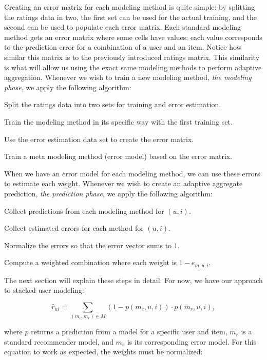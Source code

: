 Creating an error matrix for each modeling method is quite simple:
by splitting the ratings data in two,
the first set can be used for the actual training, and the second
can be used to populate each error matrix.
Each standard modeling method gets an error matrix where some cells have values:
each value corresponds to the prediction error for a combination of a user and an item.
Notice how similar this matrix is to the previously introduced ratings matrix.
This similarity is what will allow us using the exact same modeling methods
to perform adaptive aggregation.
Whenever we wish to train a new modeling method,
\emph{the modeling phase}, we apply the following algorithm:

\begin{enumerate*}
  \item Split the ratings data into two sets for training and error estimation.
  \item Train the modeling method in its specific way with the first training set.
  \item Use the error estimation data set to create the error matrix.
  \item Train a meta modeling method (error model) based on the error matrix.
\end{enumerate*}

When we have an error model for each modeling method, 
we can use these errors to estimate each weight.
Whenever we wish to create an adaptive aggregate prediction,
\emph{the prediction phase},
we apply the following algorithm:

\begin{enumerate*}
  \item Collect predictions from each modeling method for $(u,i)$.
  \item Collect estimated errors for each method for $(u,i)$.
  \item Normalize the errors so that the error vector sums to $1$.
  \item Compute a weighted combination where each weight is $1 - e_{m,u,i}$.
\end{enumerate*}

The next section will explain these steps in detail.
For now, we have our approach to stacked user modeling:

\begin{equation*}
  \hat{r}_{ui} = \sum_{(m_{e}, m_{r}) \in M} (1 - p(m_{e},u,i)) \cdot p(m_{r},u,i),
\end{equation*}

where $p$ returns a prediction from a model for a specific user and item,
$m_{r}$ is a standard recommender model, 
and $m_{e}$ is its corresponding error model.
For this equation to work as expected, the weights must be normalized:

